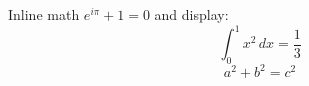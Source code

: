 Inline math $e^{i\pi} + 1 = 0$ and display:
\[
  \int_0^1 x^2 \, dx = \frac{1}{3}
\]
\begin{equation}
  a^2 + b^2 = c^2 \label{eq:pyth}
\end{equation}
